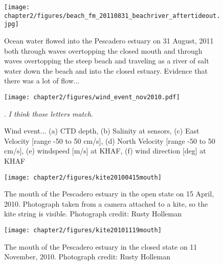 \begin{figure}
		\texttt{[image: chapter2/figures/beach\_fm\_20110831\_beachriver\_aftertideout.jpg]} \caption{Ocean water flowed into the Pescadero estuary on 31 August, 2011 both through waves overtopping the closed mouth and through waves overtopping the steep beach and traveling as a river of salt water down the beach and into the closed estuary. Evidence that there was a lot of flow...} \label{fig:beachriver_after} 
\end{figure}

\begin{figure}[t]
	\centering
	\texttt{[image: chapter2/figures/wind\_event\_nov2010.pdf]}
\caption{Wind event... (a) CTD depth, (b) Salinity at sensors, (c) East Velocity [range -50 to 50 cm/s], (d) North Velocity [range -50 to 50 cm/s], (e) windspeed [m/s] at KHAF, (f) wind direction [deg] at KHAF}. \emph{I think those letters match}.
\label{fig:closed_UVwindsalt}
\end{figure}

\begin{figure}
	\begin{center}
		\texttt{[image: chapter2/figures/kite20100415mouth]} 
	\end{center}
\caption{The mouth of the Pescadero estuary in the open state on 15 April, 2010. Photograph taken from a camera attached to a kite, so the kite string is visible. Photograph credit: Rusty Holleman}\label{fig:kite_photos} \end{figure}

\begin{figure}
	\begin{center}
		\texttt{[image: chapter2/figures/kite20101119mouth]} 
	\end{center}
\caption{The mouth of the Pescadero estuary in the closed state on 11 November, 2010.  Photograph credit: Rusty Holleman}\label{fig:kite_photos} \end{figure}


